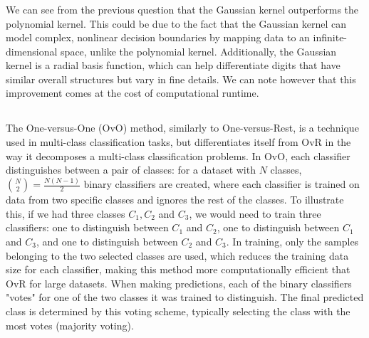 \documentclass[final,3p,times,12pt]{article}
\begin{document}
\subsubsection{}

We can see from the previous question that the Gaussian kernel outperforms the polynomial kernel. This could be due to the fact that the Gaussian kernel can model complex, nonlinear decision boundaries by mapping data to an infinite-dimensional space, unlike the polynomial kernel. Additionally, the Gaussian kernel is a radial basis function, which can help differentiate digits that have similar overall structures but vary in fine details. We can note however that this improvement comes at the cost of computational runtime. 

\subsection{}
\subsubsection{}

The One-versus-One (OvO) method, similarly to One-versus-Rest, is a technique used in multi-class classification tasks, but differentiates itself from OvR in the way it decomposes a multi-class classification problems. In OvO, each classifier distinguishes between a pair of classes: for a dataset with \( N \) classes, \( \binom{N}{2} = \frac{N(N-1)}{2} \) binary classifiers are created, where each classifier is trained on data from two specific classes and ignores the rest of the classes. To illustrate this, if we had three classes $C_1, C_2$ and $C_3$, we would need to train three classifiers: one to distinguish between $C_1$ and $C_2$, one to distinguish between $C_1$ and $C_3$, and one to distinguish between $C_2$ and $C_3$. In training, only the samples belonging to the two selected classes are used, which reduces the training data size for each classifier, making this method more computationally efficient that OvR for large datasets. When making predictions, each of the binary classifiers "votes" for one of the two classes it was trained to distinguish. The final predicted class is determined by this voting scheme, typically selecting the class with the most votes (majority voting).

\subsubsection{}
\end{document}
